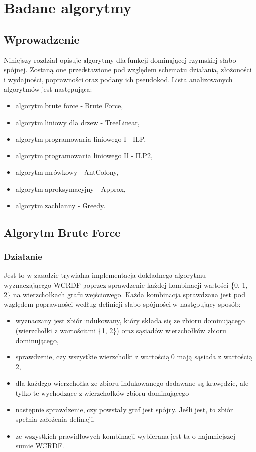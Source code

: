 \chapter{Badane algorytmy}

\section{Wprowadzenie}
Niniejszy rozdział opisuje algorytmy dla funkcji dominującej rzymskiej słabo spójnej. Zostaną one przedstawione pod względem schematu działania, złożoności i wydajności, poprawności oraz podany ich pseudokod. Lista analizowanych algorytmów jest następująca:

\begin{itemize}
    \item algorytm brute force - Brute Force,
    \item algorytm liniowy dla drzew - TreeLinear,
    \item algorytm programowania liniowego I - ILP,
    \item algorytm programowania liniowego II - ILP2,
    \item algorytm mrówkowy - AntColony,
    \item algorytm aproksymacyjny - Approx,
    \item algorytm zachłanny - Greedy.
\end{itemize}

\section{Algorytm Brute Force}

\subsection{Działanie}
Jest to w zasadzie trywialna implementacja dokładnego algorytmu wyznaczającego WCRDF poprzez sprawdzenie każdej kombinacji wartości \{0, 1, 2\} na wierzchołkach grafu wejściowego. Każda kombinacja sprawdzana jest pod względem poprawności według definicji słabo spójności w następujący sposób:
\begin{itemize}
    \item wyznaczany jest zbiór indukowany, który składa się ze zbioru dominującego (wierzchołki z wartościami \{1, 2\}) oraz sąsiadów wierzchołków zbioru dominującego,
    \item sprawdzenie, czy wszystkie wierzchołki z wartością 0 mają sąsiada z wartością 2,
    \item dla każdego wierzchołka ze zbioru indukowanego dodawane są krawędzie, ale tylko te wychodzące z wierzchołków zbioru dominującego
    \item następnie sprawdzenie, czy powstały graf jest spójny. Jeśli jest, to zbiór spełnia założenia definicji,
    \item ze wszystkich prawidłowych kombinacji wybierana jest ta o najmniejszej sumie WCRDF.
\end{itemize}

